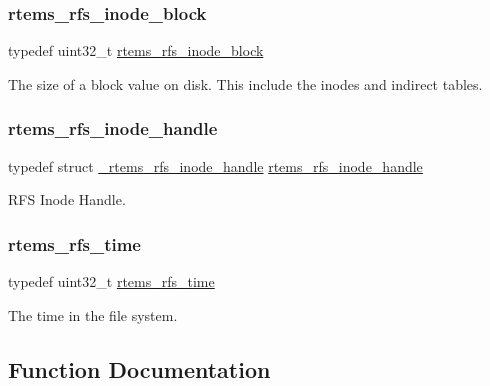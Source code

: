 \subsubsection{\texorpdfstring{rtems\_rfs\_inode\_block}{rtems\_rfs\_inode\_block}}
{\footnotesize\ttfamily typedef uint32\+\_\+t \mbox{\hyperlink{rtems-rfs-inode_8h_aa30717f37e5238a8f6387b4d0dbb2ae3}{rtems\+\_\+rfs\+\_\+inode\+\_\+block}}}

The size of a block value on disk. This include the inodes and indirect tables. \mbox{\label{rtems-rfs-inode_8h_a91f02dac5a2d91e072d676f3266ab8d2}} 
\subsubsection{\texorpdfstring{rtems\_rfs\_inode\_handle}{rtems\_rfs\_inode\_handle}}
{\footnotesize\ttfamily typedef struct \mbox{\hyperlink{struct__rtems__rfs__inode__handle}{\+\_\+rtems\+\_\+rfs\+\_\+inode\+\_\+handle}}  \mbox{\hyperlink{rtems-rfs-inode_8h_a91f02dac5a2d91e072d676f3266ab8d2}{rtems\+\_\+rfs\+\_\+inode\+\_\+handle}}}

R\+FS Inode Handle. \mbox{\label{rtems-rfs-inode_8h_a7877cc60240d76cccb89acaffdd20aa6}} 
\subsubsection{\texorpdfstring{rtems\_rfs\_time}{rtems\_rfs\_time}}
{\footnotesize\ttfamily typedef uint32\+\_\+t \mbox{\hyperlink{rtems-rfs-inode_8h_a7877cc60240d76cccb89acaffdd20aa6}{rtems\+\_\+rfs\+\_\+time}}}

The time in the file system. 

\subsection{Function Documentation}
\mbox{\label{rtems-rfs-inode_8h_a3debf4c8c9f9149e355abd82a1804e44}} 
